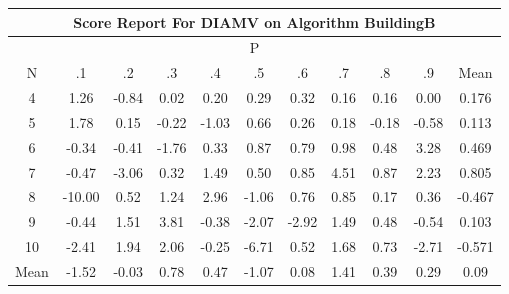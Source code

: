 \documentclass[11pt,a4paper]{report}
\begin{document}
\begin{longtable}{ | c || c | c | c | c | c | c | c | c | c || c |}
\hline
\multicolumn{11}{|c|}{ Score Report For DIAMV on Algorithm BuildingB} \\
\hline
\multicolumn{11}{|c|}{ P } \\
\hline
N & .1 & .2 & .3 & .4 & .5 & .6 & .7 & .8 & .9 & Mean\\
 \hline
 \hline
 \endhead
  4 &  \cellcolor[HTML]{DFDFFF} 1.26 &  \cellcolor[HTML]{FFE7E7} -0.84 &  \cellcolor[HTML]{FFFFFF} 0.02 &  \cellcolor[HTML]{F7F7FF} 0.20 &  \cellcolor[HTML]{F7F7FF} 0.29 &  \cellcolor[HTML]{F7F7FF} 0.32 &  \cellcolor[HTML]{F7F7FF} 0.16 &  \cellcolor[HTML]{F7F7FF} 0.16 &  \cellcolor[HTML]{FFFFFF} 0.00 & 0.176 \\
  5 &  \cellcolor[HTML]{CFCFFF} 1.78 &  \cellcolor[HTML]{FFFFFF} 0.15 &  \cellcolor[HTML]{FFF7F7} -0.22 &  \cellcolor[HTML]{FFE7E7} -1.03 &  \cellcolor[HTML]{EFEFFF} 0.66 &  \cellcolor[HTML]{F7F7FF} 0.26 &  \cellcolor[HTML]{F7F7FF} 0.18 &  \cellcolor[HTML]{FFF7F7} -0.18 &  \cellcolor[HTML]{FFEFEF} -0.58 & 0.113 \\
  6 &  \cellcolor[HTML]{FFF7F7} -0.34 &  \cellcolor[HTML]{FFF7F7} -0.41 &  \cellcolor[HTML]{FFCFCF} -1.76 &  \cellcolor[HTML]{F7F7FF} 0.33 &  \cellcolor[HTML]{E7E7FF} 0.87 &  \cellcolor[HTML]{E7E7FF} 0.79 &  \cellcolor[HTML]{E7E7FF} 0.98 &  \cellcolor[HTML]{EFEFFF} 0.48 &  \cellcolor[HTML]{AFAFFF} 3.28 & 0.469 \\
  7 &  \cellcolor[HTML]{FFF7F7} -0.47 &  \cellcolor[HTML]{FFAFAF} -3.06 &  \cellcolor[HTML]{F7F7FF} 0.32 &  \cellcolor[HTML]{D7D7FF} 1.49 &  \cellcolor[HTML]{EFEFFF} 0.50 &  \cellcolor[HTML]{E7E7FF} 0.85 &  \cellcolor[HTML]{8F8FFF} 4.51 &  \cellcolor[HTML]{E7E7FF} 0.87 &  \cellcolor[HTML]{C7C7FF} 2.23 & 0.805 \\
  8 &  \cellcolor[HTML]{FF0000} -10.00 &  \cellcolor[HTML]{EFEFFF} 0.52 &  \cellcolor[HTML]{DFDFFF} 1.24 &  \cellcolor[HTML]{B7B7FF} 2.96 &  \cellcolor[HTML]{FFE7E7} -1.06 &  \cellcolor[HTML]{EFEFFF} 0.76 &  \cellcolor[HTML]{E7E7FF} 0.85 &  \cellcolor[HTML]{F7F7FF} 0.17 &  \cellcolor[HTML]{F7F7FF} 0.36 & -0.467 \\
  9 &  \cellcolor[HTML]{FFF7F7} -0.44 &  \cellcolor[HTML]{D7D7FF} 1.51 &  \cellcolor[HTML]{9F9FFF} 3.81 &  \cellcolor[HTML]{FFF7F7} -0.38 &  \cellcolor[HTML]{FFC7C7} -2.07 &  \cellcolor[HTML]{FFB7B7} -2.92 &  \cellcolor[HTML]{D7D7FF} 1.49 &  \cellcolor[HTML]{EFEFFF} 0.48 &  \cellcolor[HTML]{FFEFEF} -0.54 & 0.103 \\
  10 &  \cellcolor[HTML]{FFBFBF} -2.41 &  \cellcolor[HTML]{CFCFFF} 1.94 &  \cellcolor[HTML]{CFCFFF} 2.06 &  \cellcolor[HTML]{FFF7F7} -0.25 &  \cellcolor[HTML]{FF5858} -6.71 &  \cellcolor[HTML]{EFEFFF} 0.52 &  \cellcolor[HTML]{D7D7FF} 1.68 &  \cellcolor[HTML]{EFEFFF} 0.73 &  \cellcolor[HTML]{FFB7B7} -2.71 & -0.571 \\
 \hline
 \hline
Mean &  \cellcolor[HTML]{FFD7D7} -1.52 &  \cellcolor[HTML]{FFFFFF} -0.03 &  \cellcolor[HTML]{EFEFFF} 0.78 &  \cellcolor[HTML]{F7F7FF} 0.47 &  \cellcolor[HTML]{FFE7E7} -1.07 &  \cellcolor[HTML]{FFFFFF} 0.08 &  \cellcolor[HTML]{DFDFFF} 1.41 &  \cellcolor[HTML]{F7F7FF} 0.39 &  \cellcolor[HTML]{F7F7FF} 0.29 &  \cellcolor[HTML]{FFFFFF} 0.09
\end{longtable}
\end{document}
